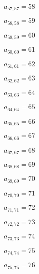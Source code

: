 \documentclass[a4paper,12pt]{article}
\begin{document}
$a _{ 57, 57 } = 58$

$a _{ 58, 58 } = 59$

$a _{ 59, 59 } = 60$

$a _{ 60, 60 } = 61$

$a _{ 61, 61 } = 62$

$a _{ 62, 62 } = 63$

$a _{ 63, 63 } = 64$

$a _{ 64, 64 } = 65$

$a _{ 65, 65 } = 66$

$a _{ 66, 66 } = 67$

$a _{ 67, 67 } = 68$

$a _{ 68, 68 } = 69$

$a _{ 69, 69 } = 70$

$a _{ 70, 70 } = 71$

$a _{ 71, 71 } = 72$

$a _{ 72, 72 } = 73$

$a _{ 73, 73 } = 74$

$a _{ 74, 74 } = 75$

$a _{ 75, 75 } = 76$
\end{document}

